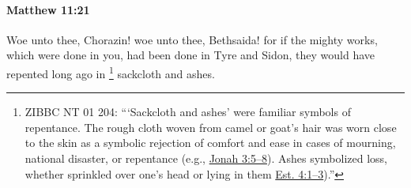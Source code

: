 			\begin{framed}
			\scriptsize
				\begin{compactdesc}
					\item[SBLG] 
				\end{compactdesc}
			\end{framed}

		\paragraph{Matthew 11:21} %
			\label{MATTHEW-11-21}

			Woe unto thee, Chorazin! woe unto thee, Bethsaida! for if the mighty works, which were done in you, had been done in Tyre and Sidon, they would have repented long ago in
				\footnote{%
					ZIBBC NT 01 204: ```Sackcloth and ashes' were familiar symbols of repentance. The rough cloth woven from camel or goat's hair was worn close to the skin as a symbolic rejection of comfort and ease in cases of mourning, national disaster, or repentance (e.g., \hyperref[JONAH-3-5]{Jonah 3:5--8}). Ashes symbolized loss, whether sprinkled over one's head or lying in them \hyperref[ESTHER-4-1]{Est. 4:1--3}).''
					}%
			sackcloth and ashes.

